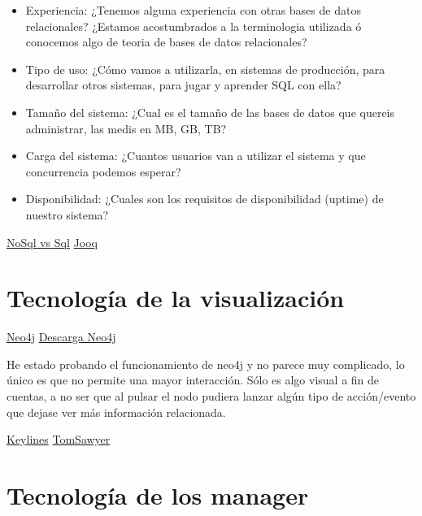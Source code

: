 \documentclass[a4paper,12pt]{article}
\begin{document}
\begin{itemize}
\item Experiencia: ¿Tenemos alguna experiencia con otras bases de datos relacionales? ¿Estamos acostumbrados a la terminologia utilizada ó conocemos algo de teoria de bases de datos relacionales?
\item Tipo de uso: ¿Cómo vamos a utilizarla, en sistemas de producción, para desarrollar otros sistemas, para jugar y aprender SQL con ella?
\item Tamaño del sistema: ¿Cual es el tamaño de las bases de datos que quereis administrar, las medis en MB, GB, TB?
\item Carga del sistema: ¿Cuantos usuarios van a utilizar el sistema y que concurrencia podemos esperar?
\item Disponibilidad: ¿Cuales son los requisitos de disponibilidad (uptime) de nuestro sistema?
\end{itemize}

\href{http://www.nosql-vs-sql.com/}{NoSql vs Sql}
\href{http://www.jooq.org/}{Jooq}

\section{Tecnología de la visualización}

\href{http://neo4j.com/developer/guide-data-visualization/}{Neo4j}
\href{http://neo4j.com/download-thanks/?edition=community&flavour=unix&release=2.2.2}{Descarga Neo4j}

He estado probando el funcionamiento de neo4j y no parece muy complicado, lo único es que no permite una mayor interacción. Sólo es algo visual a fin de cuentas, a no ser que al pulsar el nodo pudiera lanzar algún tipo de acción/evento que dejase ver más información relacionada.

\href{http://keylines.com/}{Keylines}
\href{https://www.tomsawyer.com/}{TomSawyer}

\section{Tecnología de los manager}
\end{document}
